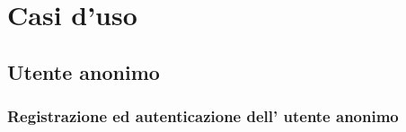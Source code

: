 \documentclass{article}
\begin{document}
\clearpage

\section{Casi d'uso}

\subsection{Utente anonimo}

\subsubsection{Registrazione ed autenticazione dell' utente anonimo}
\end{document}
